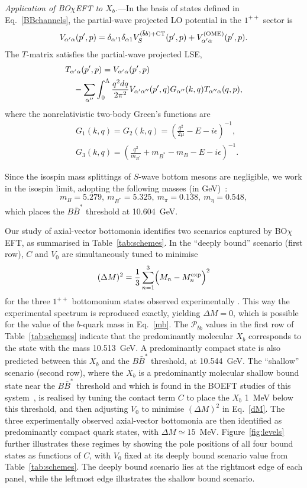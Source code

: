 \documentclass[aps,prl,showpacs,amsmath,twocolumn,superscriptaddress,floatfix,nofootinbib,notitlepage]{revtex4-2}
\newcommand{\be}{\begin{equation}}
\newcommand{\ee}{\end{equation}}
\newcommand{\QQ}{\bar{b}b}
\newcommand{\Xb}{X_b}
\newcommand{\BOchiEFT}{BO$\chi$EFT\xspace}
\newcommand{\VOME}{V^{\rm (OME)}}
\begin{document}
{\it Application of \BOchiEFT to $\Xb$.}---In the basis of states defined in Eq.~\eqref{BBchannels}, the partial-wave projected LO potential in the $1^{++}$ sector is
\be
V_{\alpha'\alpha}(p',p)=\delta_{\alpha' 1}\delta_{\alpha 1}
V_S^{(\QQ)+{\rm CT}}(p',p)+\VOME_{\alpha'\alpha}(p',p).
\label{Vcoupled}
\ee
The $T$-matrix satisfies the partial-wave projected LSE,
\begin{align}
&T_{\alpha'\alpha}(p',p)=V_{\alpha'\alpha}(p',p) \label{LSEfull2}\\
&\quad -\sum_{\alpha''}\int_0^\Lambda\frac{q^2dq}{2\pi^2}
V_{\alpha'\alpha''}(p',q)G_{\alpha''}(k,q) T_{\alpha''\alpha}(q,p),\notag
\end{align}
where the nonrelativistic two-body Green's functions are
\be
\begin{split}
&G_1(k,q)=G_2(k,q)=\left(\frac{q^2}{2\mu}-E-i\epsilon\right)^{-1},\\
&G_3(k,q)=\left(\frac{q^2}{m_{B^*}}+m_{B^*}-m_B-E-i\epsilon\right)^{-1}.
\label{Gpropdef}
\end{split}
\ee

Since the isospin mass splittings of $S$-wave bottom mesons are negligible, we work in the isospin limit, adopting the following masses (in GeV)~\cite{ParticleDataGroup:2026mpi}:
$$
m_B=5.279,~ m_{B^*}=5.325,~
m_\pi=0.138,~ m_\eta=0.548,
$$
which places the $B\bar{B}^*$ threshold at 10.604~GeV.

Our study of axial-vector bottomonia identifies two scenarios captured by \BOchiEFT, as summarised in Table~\ref{tab:schemes}. In the ``deeply bound'' scenario (first row), $C$ and $V_0$ are simultaneously tuned to minimise
\be
(\Delta M)^2=\frac13\sum_{n=1}^3\Bigl(M_n-M_n^{\rm exp}\Bigr)^2
\label{dM}
\ee
for the three $1^{++}$ bottomonium states observed experimentally \cite{ParticleDataGroup:2026mpi}.
This way the experimental spectrum is reproduced exactly, yielding $\Delta M=0$, which is possible for the value of the $b$-quark mass in Eq.~\eqref{mb}. The $\mathcal P_{\bar{b}b}$ values in the first row of Table~\ref{tab:schemes} indicate that the predominantly molecular $\Xb$ corresponds to the state with the mass 10.513~GeV. A predominantly compact state is also predicted between this $\Xb$ and the $B\bar{B}^*$ threshold, at 10.544~GeV. 
The ``shallow'' scenario (second row), where the $\Xb$ is a predominantly molecular shallow bound state near the $B\bar{B}^*$ threshold and
which is found in the BOEFT studies of this system~\cite{Brambilla:2024imu,Brambilla:2026jqz},  is realised by tuning the contact term $C$ to place the $\Xb$ 1~MeV below this threshold, and then adjusting $V_0$ to minimise $(\Delta M)^2$ in Eq.~\eqref{dM}. The three experimentally observed axial-vector bottomonia are then identified as predominantly compact quark states, with $\Delta M\simeq 15$~MeV. Figure~\ref{fig:levels} further illustrates these regimes by showing the pole positions of all four bound states as functions of $C$, with $V_0$ fixed at its deeply bound scenario value from Table~\ref{tab:schemes}. The deeply bound scenario lies at the rightmost edge of each panel, while the leftmost edge illustrates the shallow bound scenario.
\end{document}
